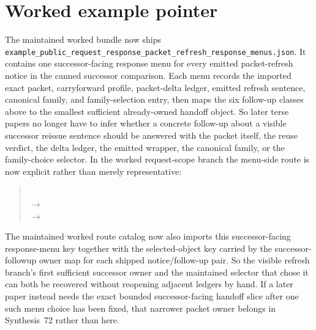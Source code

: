\documentclass[11pt]{article}
\begin{document}
\section{Worked example pointer}
The maintained worked bundle now ships \nolinkurl{example_public_request_response_packet_refresh_response_menus.json}.\cite{series:workedexample}
It contains one successor-facing response menu for every emitted packet-refresh notice in the canned successor comparison.
Each menu records the imported exact packet, carryforward profile, packet-delta ledger, emitted refresh sentence, canonical family, and family-selection entry, then maps the six follow-up classes above to the smallest sufficient already-owned handoff object.
So later terse papers no longer have to infer whether a concrete follow-up about a visible successor reissue sentence should be answered with the packet itself, the reuse verdict, the delta ledger, the emitted wrapper, the canonical family, or the family-choice selector.
In the worked request-scope branch the menu-side route is now explicit rather than merely representative:
\begin{quote}\small\ttfamily
{}\\
$\to$ \\
$\to$ 
\end{quote}
The maintained worked route catalog now also imports this successor-facing response-menu key together with the selected-object key carried by the successor-followup owner map for each shipped notice/follow-up pair. So the visible refresh branch's first sufficient successor owner and the maintained selector that chose it can both be recovered without reopening adjacent ledgers by hand. If a later paper instead needs the exact bounded successor-facing handoff slice after one such menu choice has been fixed, that narrower packet owner belongs in Synthesis~72 rather than here.
\end{document}
